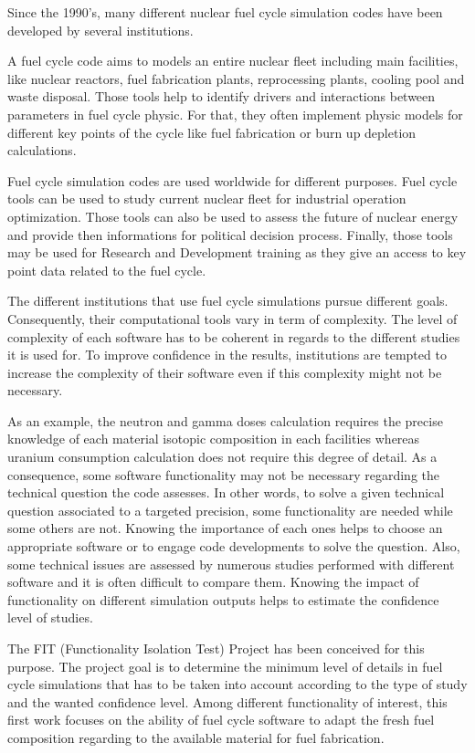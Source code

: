 Since the 1990's, many different nuclear fuel cycle simulation codes have been
developed by several institutions.

A fuel cycle code aims to models an entire nuclear fleet including main
facilities, like nuclear reactors, fuel fabrication plants, reprocessing plants,
cooling pool and waste disposal. Those tools help to identify drivers and
interactions between parameters in fuel cycle physic. For that, they often
implement physic models for different key points of the cycle like fuel
fabrication or burn up depletion calculations. 

Fuel cycle simulation codes are used worldwide for different purposes. Fuel
cycle tools can be used to study current nuclear fleet for industrial operation
optimization. Those tools can also be used to assess the future of nuclear
energy and provide then informations for political decision process. Finally,
those tools may be used for Research and Development training as they give an
access to key point data related to the fuel cycle. 

The different institutions that use fuel cycle simulations pursue different
goals. Consequently, their computational tools vary in term of complexity. The
level of complexity of each software has to be coherent in regards to the
different studies it is used for. To improve confidence in the results,
institutions are tempted to increase the complexity of their software even if
this complexity might not be necessary.

As an example, the neutron and gamma doses calculation requires the precise
knowledge of each material isotopic composition in each facilities whereas
uranium consumption calculation does not require this degree of detail. As a
consequence, some software functionality may not be necessary regarding the
technical question the code assesses. In other words, to solve a given technical
question associated to a targeted precision, some functionality are needed while
some others are not. Knowing the importance of each ones helps to choose an
appropriate software or to engage code developments to solve the question. Also,
some technical issues are assessed by numerous studies performed with different
software and it is often difficult to compare them. Knowing the impact of
functionality on different simulation outputs helps to estimate the confidence
level of studies.

The FIT (Functionality Isolation Test) Project has been conceived for this
purpose. The project goal is to determine the minimum level of details in fuel
cycle simulations that has to be taken into account according to the type of
study and the wanted confidence level. Among different functionality of
interest, this first work focuses on the ability of fuel cycle software to adapt
the fresh fuel composition regarding to the available material for fuel
fabrication.

